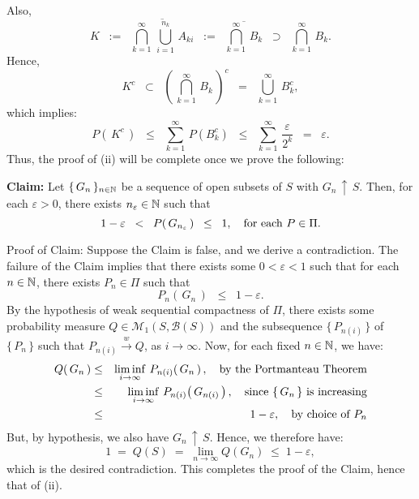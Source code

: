 Also,
\begin{equation*}
K
\;\; := \;\; \overline{\bigcap_{k=1}^{\infty}\,\bigcup_{i=1}^{n_{k}}\,A_{ki}}
\;\; := \;\; \overline{\bigcap_{k=1}^{\infty}\,B_{k}}
\;\; \supset \;\; \bigcap_{k=1}^{\infty}\,B_{k}.
\end{equation*}
Hence,
\begin{equation*}
K^{c}
\;\; \subset \;\; \left(\,\bigcap_{k=1}^{\infty}\,B_{k}\,\right)^{c}
\;\; = \;\; \bigcup_{k=1}^{\infty}\,B_{k}^{c},
\end{equation*}
which implies:
\begin{equation*}
P\!\left(\,K^{c}\,\right)
\;\; \leq \;\; \sum_{k=1}^{\infty}\,P(B_{k}^{c})
\;\; \leq \;\; \sum_{k=1}^{\infty}\,\dfrac{\varepsilon}{2^{k}}
\;\; = \;\; \varepsilon.
\end{equation*}
Thus, the proof of (ii) will be complete once we prove the following:

\vskip 0.5cm
\begin{center}
\begin{minipage}{6.0in}
\noindent
\textbf{Claim:}\;\;
Let $\{\,G_{n}\,\}_{n\in\mathbb{N}}$ be a sequence of open subsets of $S$ with $G_{n}\,\uparrow\,S$.
Then, for each $\varepsilon > 0$, there exists $n_{\varepsilon} \in \mathbb{N}$ such that
\begin{equation*}
1 - \varepsilon \;\;<\;\; P\!\left(\,G_{n_{\varepsilon}}\,\right) \;\;\leq\;\; 1,
\quad\textnormal{for each $P \in \Pi$}.
\end{equation*}
\end{minipage}
\end{center}
\vskip 0.2cm
\noindent
Proof of Claim: Suppose the Claim is false, and we derive a contradiction.
The failure of the Claim implies that there exists some $0 < \varepsilon < 1$
such that for each $n \in \mathbb{N}$, there exists $P_{n} \in \Pi$ such that
\begin{equation*}
P_{n}\!\left(\,G_{n}\,\right) \;\;\leq\;\; 1 - \varepsilon.
\end{equation*}
By the hypothesis of weak sequential compactness of $\Pi$,
there exists some probability measure $Q \in \mathcal{M}_{1}\!\left(S,\mathcal{B}(S)\right)$
and the subsequence $\{\,P_{n(i)}\,\}$ of $\{\,P_{n}\,\}$ such that
$P_{n(i)}\overset{w}{\longrightarrow} Q$, as $i \longrightarrow \infty$.
Now, for each fixed $n \in \mathbb{N}$, we have:
\begin{eqnarray*}
Q\!\left(\,G_{n}\,\right)
&\leq& \liminf_{i\rightarrow\infty}\,P_{n(i)}\!\left(\,G_{n}\,\right), \quad\textnormal{by the Portmanteau Theorem} \\
&\leq& \liminf_{i\rightarrow\infty}\,P_{n(i)}\!\left(\,G_{n(i)}\,\right), \quad\textnormal{since $\{\,G_{n}\,\}$ is increasing} \\
&\leq& 1 - \varepsilon, \quad\textnormal{by choice of $P_{n}$}
\end{eqnarray*}
But, by hypothesis, we also have $G_{n}\,\uparrow\,S$.
Hence, we therefore have:
\begin{equation*}
1 \;=\; Q(S) \;=\; \lim_{n\rightarrow\infty}Q(G_{n}) \;\leq\; 1 - \varepsilon,
\end{equation*}
which is the desired contradiction. This completes the proof of the Claim, hence that of (ii).

